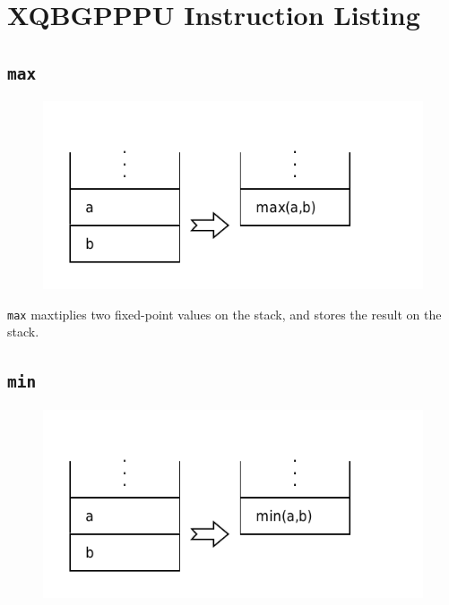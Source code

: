 \chapter{XQBGPPPU Instruction Listing}

\section*{\texttt{max}}

	\begin{figure}
		\begin{flushright}
			\includegraphics[width=0.9\linewidth]{figure/pdf/i_max} 
		\end{flushright}
	\end{figure}

		\texttt{max} maxtiplies two fixed-point values on the stack, and stores
		the result on the stack.

\section*{\texttt{min}}

	\begin{figure}
		\begin{flushright}
			\includegraphics[width=0.9\linewidth]{figure/pdf/i_min} 
		\end{flushright}
	\end{figure}

